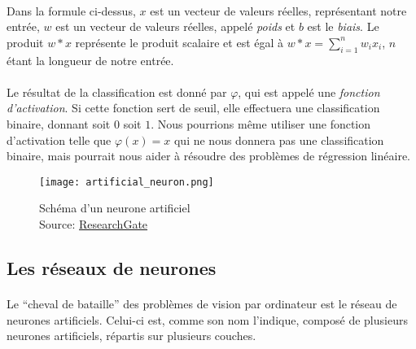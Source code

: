 \paragraph{}
Dans la formule ci-dessus, $x$ est un vecteur de valeurs réelles, représentant notre entrée, $w$ est un vecteur de valeurs réelles, appelé \emph{poids} et $b$ est le \emph{biais}.
Le produit $w * x$ représente le produit scalaire et est égal à $w * x = \sum _{i=1}^{n}w_{i}x_{i}$, $n$ étant la longueur de notre entrée.

\paragraph{}
Le résultat de la classification est donné par $\varphi$, qui est appelé une \emph{fonction d'activation}.
Si cette fonction sert de seuil, elle effectuera une classification binaire, donnant soit $0$ soit $1$.
Nous pourrions même utiliser une fonction d'activation telle que $\varphi(x) = x$ qui ne nous donnera pas une classification binaire, mais pourrait nous aider à résoudre des problèmes de régression linéaire.

\begin{figure}[h]
    \centering
    \texttt{[image: artificial\_neuron.png]}
    \caption{Schéma d'un neurone artificiel\\Source: \href{https://www.researchgate.net/figure/Scheme-of-a-perceptron-A-nonlinear-activation-function-BULLET-is-applied-to-the_fig3_315788933}{ResearchGate}}
\end{figure}


\subsection{Les réseaux de neurones}
\paragraph{}
Le ``cheval de bataille'' des problèmes de vision par ordinateur est le réseau de neurones artificiels.
Celui-ci est, comme son nom l'indique, composé de plusieurs neurones artificiels, répartis sur plusieurs couches.


